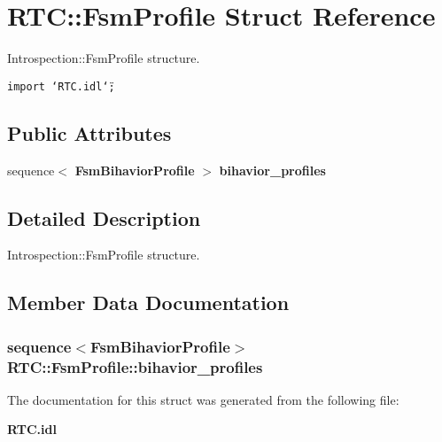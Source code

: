 \section{RTC::Fsm\-Profile Struct Reference}
\label{structRTC_1_1FsmProfile}
Introspection::Fsm\-Profile structure.  


{\tt import \char`\"{}RTC.idl\char`\"{};}

\subsection*{Public Attributes}
\begin{CompactItemize}
\item 
sequence$<$ {\bf Fsm\-Bihavior\-Profile} $>$ {\bf bihavior\_\-profiles}
\end{CompactItemize}


\subsection{Detailed Description}
Introspection::Fsm\-Profile structure. 



\subsection{Member Data Documentation}
\subsubsection{\setlength{\rightskip}{0pt plus 5cm}sequence$<${\bf Fsm\-Bihavior\-Profile}$>$ {\bf RTC::Fsm\-Profile::bihavior\_\-profiles}}\label{structRTC_1_1FsmProfile_RTC_1_1FsmProfileo0}




The documentation for this struct was generated from the following file:\begin{CompactItemize}
\item 
{\bf RTC.idl}\end{CompactItemize}

